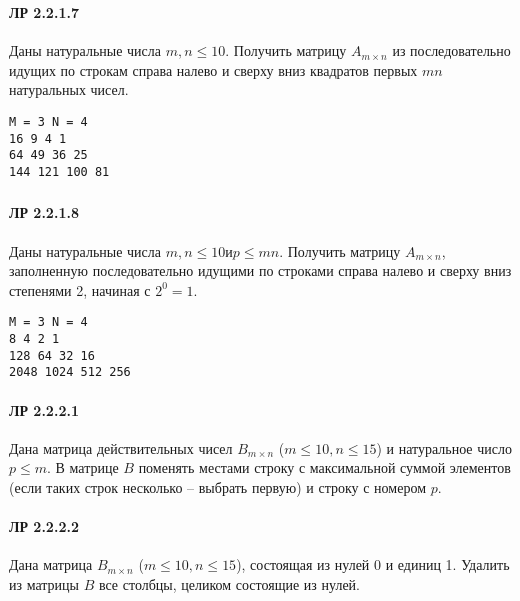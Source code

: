 \documentclass[12pt,a4paper]{report}
\begin{document}
\subsubsection*{} \noindent
\begin{minipage}{0.75\textwidth}
\paragraph*{ЛР 2.2.1.7} 
Даны натуральные числа $m,n \le 10$. Получить матрицу $A_{m \times n}$ из последовательно идущих по строкам справа налево и сверху вниз квадратов первых $mn$ натуральных чисел.
\end{minipage}
\hfill
\begin{minipage}{0.2\textwidth}
\begin{verbatim}
M = 3 N = 4
16 9 4 1
64 49 36 25
144 121 100 81
\end{verbatim}
\end{minipage}

\subsubsection*{} \noindent
\begin{minipage}{0.75\textwidth}
\paragraph*{ЛР 2.2.1.8}
Даны натуральные числа $m,n \le 10 и p \le mn$. Получить матрицу $A_{m \times n}$, заполненную последовательно идущими по строками справа налево и сверху вниз степенями 2, начиная с $2^0 = 1$.
\end{minipage}
\hfill
\begin{minipage}{0.2\textwidth}
\begin{verbatim}
M = 3 N = 4
8 4 2 1
128 64 32 16
2048 1024 512 256
\end{verbatim}
\end{minipage}

\clearpage
\paragraph*{ЛР 2.2.2.1} Дана матрица действительных чисел $B_{m \times n}$ ($m \le 10, n \le 15$) и натуральное число $p \le m$. В матрице $B$ поменять местами строку с максимальной суммой элементов (если таких строк несколько -- выбрать первую) и строку с номером $p$.
\paragraph*{ЛР 2.2.2.2} Дана матрица $B_{m \times n}$ ($m \le 10, n \le 15$), состоящая из нулей 0 и единиц 1. Удалить из матрицы $B$ все столбцы, целиком состоящие из нулей.
\end{document}

